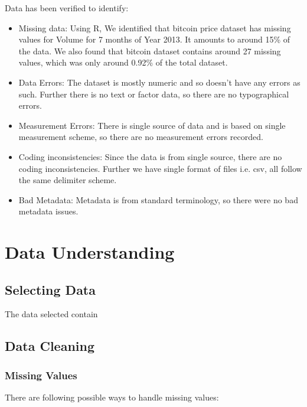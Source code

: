 \documentclass{article}
\begin{document}
Data has been verified to identify:

\begin{itemize}
\item 
Missing data: Using R, We identified that bitcoin price dataset has missing values for Volume for 7 months of Year 2013. It amounts to around 15\% of the data.
We also found that bitcoin dataset contains around 27 missing values, which was only around 0.92\% of the total dataset.

\item
Data Errors: The dataset is mostly numeric and so doesn't have any errors as such. Further there is no
text or factor data, so there are no typographical errors.

\item 
Measurement Errors: There is single source of data and is based on single measurement scheme, so there are no measurement errors recorded.

\item 
Coding inconsistencies: Since the data is from single source, there are no coding inconsistencies. Further we have single format of files i.e. csv, all follow the same delimiter scheme.

\item
Bad Metadata: Metadata is from standard terminology, so there were no bad metadata issues.
    
\end{itemize}

\section{Data Understanding}
\subsection{Selecting Data}

The data selected contain

\subsection{Data Cleaning}
\subsubsection{Missing Values}

There are following possible ways to handle missing values:
\end{document}
